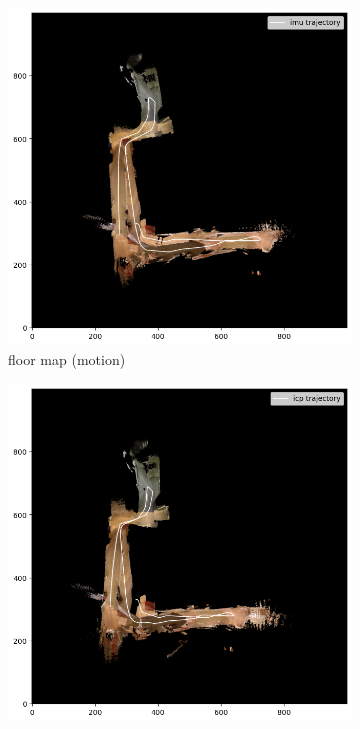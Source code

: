 \documentclass[conference]{IEEEtran}
\begin{document}
\begin{figure}[htbp]
    \begin{subfigure}{0.24\textwidth}
        \includegraphics[width=\linewidth]{../img/fmap_21_imu.png}
        \caption{floor map (motion)}
        \label{fig:fmap_21_imu}
    \end{subfigure}
    \hfill
    \begin{subfigure}{0.24\textwidth}
        \includegraphics[width=\linewidth]{../img/fmap_21_icp.png}

\end{subfigure}
\end{figure}
\end{document}

